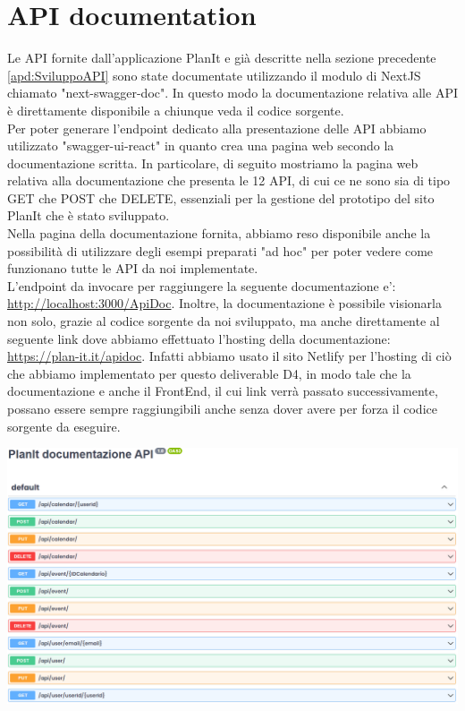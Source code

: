 \section{API documentation}
\label{secD4:APIDocumentation}
Le API fornite dall’applicazione PlanIt e già descritte nella sezione precedente \ref{apd:SviluppoAPI} sono
state documentate utilizzando il modulo di NextJS chiamato "next-swagger-doc". In questo
modo la documentazione relativa alle API è direttamente disponibile a chiunque veda il codice
sorgente.\\
Per poter generare l’endpoint dedicato alla presentazione delle API abbiamo utilizzato "swagger-ui-react" in quanto crea una pagina web secondo la documentazione scritta.
In particolare, di seguito mostriamo la pagina web relativa alla documentazione che presenta le 12 API, di cui ce ne sono sia di tipo GET che POST che DELETE, essenziali per la gestione del prototipo del sito PlanIt che è stato sviluppato.\\
Nella pagina della documentazione fornita, abbiamo reso disponibile anche la possibilità di utilizzare degli esempi preparati "ad hoc" per poter vedere come funzionano tutte le API da noi implementate. \\
L’endpoint da invocare per raggiungere la seguente documentazione e’:
\url{http://localhost:3000/ApiDoc}.
Inoltre, la documentazione è possibile visionarla non solo, grazie al codice sorgente da noi sviluppato, ma anche direttamente al seguente link dove abbiamo effettuato l'hosting della documentazione: \url{https://plan-it.it/apidoc}. Infatti abbiamo usato il sito Netlify per l'hosting di ciò che abbiamo implementato per questo deliverable D4, in modo tale che la documentazione e anche il FrontEnd, il cui link verrà passato successivamente, possano essere sempre raggiungibili anche senza dover avere per forza il codice sorgente da eseguire.
\begin{center}
    \includegraphics[width=1\textwidth, height=0.37\textheight]{img/png/documentazione.png}
\end{center}